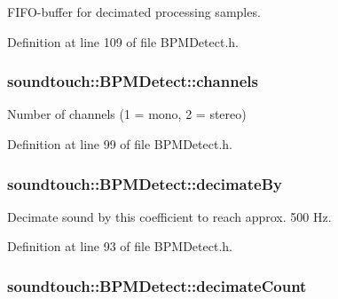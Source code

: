 F\+I\+F\+O-\/buffer for decimated processing samples. 



Definition at line 109 of file B\+P\+M\+Detect.\+h.

\subsubsection[{\texorpdfstring{channels}{channels}}]{ soundtouch\+::\+B\+P\+M\+Detect\+::channels\hspace{0.3cm}{\ttfamily [protected]}}\hypertarget{classsoundtouch_1_1_b_p_m_detect_a263b1b26a460bf619eed80dce8d03d90}{}\label{classsoundtouch_1_1_b_p_m_detect_a263b1b26a460bf619eed80dce8d03d90}


Number of channels (1 = mono, 2 = stereo) 



Definition at line 99 of file B\+P\+M\+Detect.\+h.

\subsubsection[{\texorpdfstring{decimate\+By}{decimateBy}}]{ soundtouch\+::\+B\+P\+M\+Detect\+::decimate\+By\hspace{0.3cm}{\ttfamily [protected]}}\hypertarget{classsoundtouch_1_1_b_p_m_detect_ab7fb5288ebbeec9267a663366445109f}{}\label{classsoundtouch_1_1_b_p_m_detect_ab7fb5288ebbeec9267a663366445109f}


Decimate sound by this coefficient to reach approx. 500 Hz. 



Definition at line 93 of file B\+P\+M\+Detect.\+h.

\subsubsection[{\texorpdfstring{decimate\+Count}{decimateCount}}]{ soundtouch\+::\+B\+P\+M\+Detect\+::decimate\+Count\hspace{0.3cm}{\ttfamily [protected]}}\hypertarget{classsoundtouch_1_1_b_p_m_detect_aae07e752a9f3133e46f20eda269bc5e6}{}\label{classsoundtouch_1_1_b_p_m_detect_aae07e752a9f3133e46f20eda269bc5e6}


